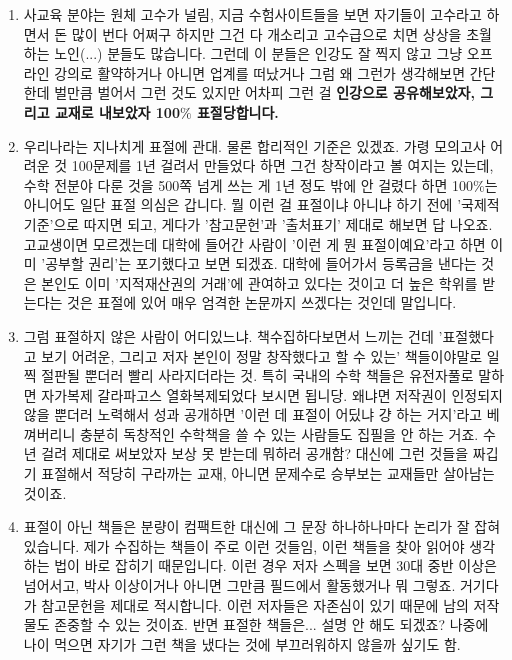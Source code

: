 \begin{enumerate}
        
    \item  사교육 분야는 원체 고수가 널림,
    지금 수험사이트들을 보면 자기들이 고수라고 하면서 돈 많이 번다 어쩌구 하지만 그건 다 개소리고
    고수급으로 치면 상상을 초월하는 노인(...) 분들도 많습니다.
    그런데 이 분들은 인강도 잘 찍지 않고 그냥 오프라인 강의로 활약하거나 아니면 업계를 떠났거나 그럼
    왜 그런가 생각해보면 간단한데
    벌만큼 벌어서 그런 것도 있지만
    어차피 그런 걸 \textbf{인강으로 공유해보았자, 그리고 교재로 내보았자 100$\%$ 표절당합니다.}
    \vspace{5mm}

    \item  우리나라는 지나치게 표절에 관대.
    물론 합리적인 기준은 있겠죠.
    가령 모의고사 어려운 것 100문제를 1년 걸려서 만들었다 하면 그건 창작이라고 볼 여지는 있는데,
    수학 전분야 다룬 것을 500쪽 넘게 쓰는 게 1년 정도 밖에 안 걸렸다 하면 100$\%$는 아니어도 일단 표절 의심은 갑니다.
    뭘 이런 걸 표절이냐 아니냐 하기 전에 '국제적 기준'으로 따지면 되고, 게다가 '참고문헌'과 '출처표기' 제대로 해보면 답 나오죠.
    고교생이면 모르겠는데 대학에 들어간 사람이 '이런 게 뭔 표절이예요'라고 하면 이미 '공부할 권리'는 포기했다고 보면 되겠죠.
    대학에 들어가서 등록금을 낸다는 것은 본인도 이미 '지적재산권의 거래'에 관여하고 있다는 것이고
    더 높은 학위를 받는다는 것은 표절에 있어 매우 엄격한 논문까지 쓰겠다는 것인데 말입니다.
    \vspace{5mm}

    \item  그럼 표절하지 않은 사람이 어디있느냐.
    책수집하다보면서 느끼는 건데 '표절했다고 보기 어려운, 그리고 저자 본인이 정말 창작했다고 할 수 있는' 책들이야말로
    일찍 절판될 뿐더러 빨리 사라지더라는 것. 특히 국내의 수학 책들은 유전자풀로 말하면 자가복제 갈라파고스 열화복제되었다 보시면 됩니당.
    왜냐면 저작권이 인정되지 않을 뿐더러 노력해서 성과 공개하면 '이런 데 표절이 어딨냐 걍 하는 거지'라고 베껴버리니
    충분히 독창적인 수학책을 쓸 수 있는 사람들도 집필을 안 하는 거죠. 수년 걸려 제대로 써보았자 보상 못 받는데 뭐하러 공개함?
    대신에 그런 것들을 짜깁기 표절해서 적당히 구라까는 교재, 아니면 문제수로 승부보는 교재들만 살아남는 것이죠.
    \vspace{5mm}

    \item  표절이 아닌 책들은 분량이 컴팩트한 대신에 그 문장 하나하나마다 논리가 잘 잡혀있습니다.
    제가 수집하는 책들이 주로 이런 것들임, 이런 책들을 찾아 읽어야 생각하는 법이 바로 잡히기 때문입니다.
    이런 경우 저자 스펙을 보면 30대 중반 이상은 넘어서고, 박사 이상이거나 아니면 그만큼 필드에서 활동했거나 뭐 그렇죠.
    거기다가 참고문헌을 제대로 적시합니다. 이런 저자들은 자존심이 있기 때문에 남의 저작물도 존중할 수 있는 것이죠.
    반면 표절한 책들은... 설명 안 해도 되겠죠? 나중에 나이 먹으면 자기가 그런 책을 냈다는 것에 부끄러워하지 않을까 싶기도 함.
    \vspace{5mm}


\end{enumerate}
